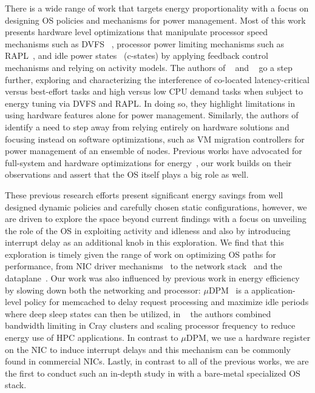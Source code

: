 There is a wide range of work that targets energy proportionality with a focus on designing OS policies and mechanisms for power management. Most of this work presents hardware level optimizations that manipulate processor speed mechanisms such as DVFS ~\cite{10.5555/2523721.2523732,10.1145/381677.381702,cpufreq_governor,4273098,packandcap,10.1109/MICRO.2006.8,1598114,10.1145/1629911.1629926,4658633,4343825,10.1109/IGCC.2011.6008552,10.1145/1241601.1241609, slowdownorsleep,4228267, mootaz}, processor power limiting mechanisms such as RAPL~\cite{intel_rapl, heracles, SmoothOperator,oldi-pegasus, Dynamo,PerAppPower,powercap}, and idle power states~\cite{cpuidle_policy,peafowl, udpm,6983037,dreamweaver, pacingtoidle} (c-states) by applying feedback control mechanisms and relying on activity models. The authors of ~\cite{heracles} and ~\cite{PerAppPower} go a step further, exploring and characterizing the interference of co-located latency-critical versus best-effort tasks and high versus low CPU demand tasks when subject to energy tuning via DVFS and RAPL. In doing so, they highlight limitations in using hardware features alone for power management. Similarly, the authors of ~\cite{hotpower2008, 7349225} identify a need to step away from relying entirely on hardware solutions and focusing instead on software optimizations, such as VM migration controllers for power management of an ensemble of nodes. Previous works have advocated for full-system and hardware optimizations for energy~\cite{slowdownorsleep,powernap}, our work builds on their observations and assert that the OS itself plays a big role as well. 

These previous research efforts present significant energy savings from well designed dynamic policies and carefully chosen static configurations, however, we are driven to explore the space beyond current findings with a focus on unveiling the role of the OS in exploiting activity and idleness and also by introducing interrupt delay as an additional knob in this exploration. We find that this exploration is timely given the range of work on optimizing OS paths for performance, from NIC driver mechanisms~\cite{flexnic, affinityaccept, network-latency} to the network stack~\cite{mtcp, sandstorm, network-latency} and the dataplane~\cite{222583, arrakis, EbbRT, shenango, zygos, ix}. Our work was also influenced by previous work in energy efficiency by slowing down both the networking and processor: $\mu$DPM~\cite{udpm} is a application-level policy for memcached to delay request processing and maximize idle periods where deep sleep states can then be utilized, in ~\cite{10.5555/2338816.2338822} the authors combined bandwidth limiting in Cray clusters and scaling processor frequency to reduce energy use of HPC applications. In contrast to $\mu$DPM, we use a hardware register on the NIC to induce interrupt delays and this mechanism can be commonly found in commercial NICs. Lastly, in contrast to all of the previous works, we are the first to conduct such an in-depth study in with a bare-metal specialized OS stack.

